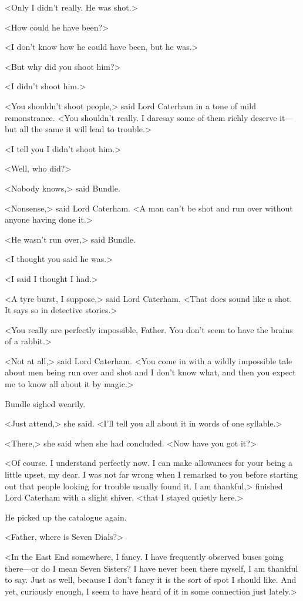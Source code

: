 <Only I didn't really. He was shot.>

<How could he have been?>

<I don't know how he could have been, but he was.>

<But why did you shoot him?>

<I didn't shoot him.>

<You shouldn't shoot people,> said Lord Caterham in a tone of mild remonstrance. <You shouldn't really. I daresay some of them richly deserve it—but all the same it will lead to trouble.>

<I tell you I didn't shoot him.>

<Well, who did?>

<Nobody knows,> said Bundle.

<Nonsense,> said Lord Caterham. <A man can't be shot and run over without anyone having done it.>

<He wasn't run over,> said Bundle.

<I thought you said he was.>

<I said I thought I had.>

<A tyre burst, I suppose,> said Lord Caterham. <That does sound like a shot. It says so in detective stories.>

<You really are perfectly impossible, Father. You don't seem to have the brains of a rabbit.>

<Not at all,> said Lord Caterham. <You come in with a wildly impossible tale about men being run over and shot and I don't know what, and then you expect me to know all about it by magic.>

Bundle sighed wearily.

<Just attend,> she said. <I'll tell you all about it in words of one syllable.>

<There,> she said when she had concluded. <Now have you got it?>

<Of course. I understand perfectly now. I can make allowances for your being a little upset, my dear. I was not far wrong when I remarked to you before starting out that people looking for trouble usually found it. I am thankful,> finished Lord Caterham with a slight shiver, <that I stayed quietly here.>

He picked up the catalogue again.

<Father, where is Seven Dials?>

<In the East End somewhere, I fancy. I have frequently observed buses going there—or do I mean Seven Sisters? I have never been there myself, I am thankful to say. Just as well, because I don't fancy it is the sort of spot I should like. And yet, curiously enough, I seem to have heard of it in some connection just lately.>

